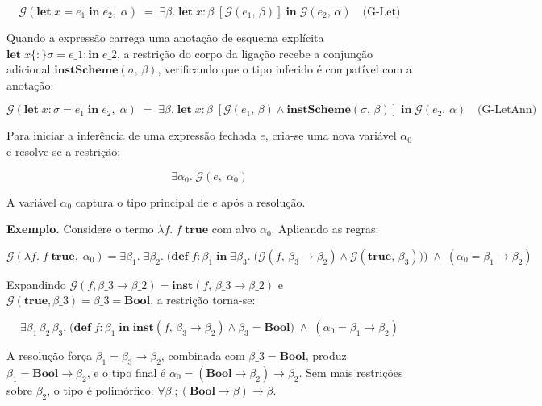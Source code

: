   \[ \mathcal{G}(\mathbf{let}\; x = e_1\; \mathbf{in}\; e_2,\; \alpha)
    \;=\; \exists \beta.\; \mathbf{let}\; x : \beta\; [\mathcal{G}(e_1,\,
  \beta)]\; \mathbf{in}\; \mathcal{G}(e_2,\, \alpha) \quad\text{(G-Let)} \]

  Quando a expressão carrega uma anotação de esquema explícita
  \(\mathbf{let}\; x \{:\} \sigma = e\_1;
  \mathbf{in}\; e\_2\), a restrição do corpo
  da ligação recebe a conjunção adicional
  \(\mathbf{instScheme}(\sigma,\, \beta)\), verificando que o tipo
  inferido é compatível com a anotação:

  \[ \mathcal{G}(\mathbf{let}\; x {:} \sigma = e_1\; \mathbf{in}\; e_2,\;
    \alpha) \;=\; \exists \beta.\; \mathbf{let}\; x : \beta\;
    [\mathcal{G}(e_1,\, \beta) \wedge \mathbf{instScheme}(\sigma,\, \beta)]\;
  \mathbf{in}\; \mathcal{G}(e_2,\, \alpha) \quad\text{(G-LetAnn)} \]

  Para iniciar a inferência de uma expressão fechada \(e\), cria-se uma
  nova variável \(\alpha_0\) e resolve-se a restrição:

  \[ \exists \alpha_0.\; \mathcal{G}(e,\; \alpha_0) \]

  A variável \(\alpha_0\) captura o tipo principal de \(e\) após a resolução.

  \textbf{Exemplo.} Considere o termo \(\lambda f.\; f\;
  \mathbf{true}\) com alvo \(\alpha_0\). Aplicando as regras:

  \[ \mathcal{G}(\lambda f.\; f\; \mathbf{true},\; \alpha_0) = \exists
    \beta_1.\; \exists \beta_2.\; \bigl(\mathbf{def}\; f : \beta_1\;
      \mathbf{in}\; \exists \beta_3.\; \bigl(\mathcal{G}(f,\, \beta_3
        \to \beta_2)
    \wedge \mathcal{G}(\mathbf{true},\, \beta_3)\bigr) \bigr) \;\wedge\;
  (\alpha_0 = \beta_1 \to \beta_2) \]

  Expandindo \(\mathcal{G}(f, \beta\_3 \to \beta\_2) =
  \mathbf{inst}(f,\, \beta\_3 \to \beta\_2)\)
  e \(\mathcal{G}(\mathbf{true}, \beta\_3) = \beta\_3 =
  \mathbf{Bool}\), a restrição torna-se:

  \[ \exists \beta_1\, \beta_2\, \beta_3.\; \bigl(\mathbf{def}\; f :
      \beta_1\; \mathbf{in}\; \mathbf{inst}(f,\, \beta_3 \to \beta_2) \wedge
  \beta_3 = \mathbf{Bool}\bigr) \;\wedge\; (\alpha_0 = \beta_1 \to \beta_2) \]

  A resolução força \(\beta_1 = \beta_3 \to \beta_2\), combinada com
  \(\beta\_3 = \mathbf{Bool}\), produz
  \(\beta_1 = \mathbf{Bool} \to \beta_2\), e o tipo final é \(\alpha_0
  = (\mathbf{Bool} \to \beta_2) \to \beta_2\). Sem mais restrições
  sobre \(\beta_2\), o tipo é polimórfico: \(\forall
  \beta.; (\mathbf{Bool} \to \beta) \to \beta\).

